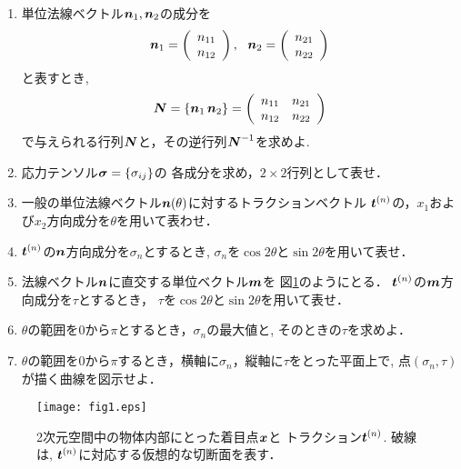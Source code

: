 \documentclass[10pt,a4j]{jarticle}
\begin{document}
\begin{enumerate}
\item
	単位法線ベクトル$\mbox{\boldmath $n$}_1, \mbox{\boldmath $n$}_2$の成分を
	\[
	\fat{n}_1=
	\left(
		\begin{array}{c}
			n_{11} \\
			n_{12}
		\end{array}
	\right), \ \ 
	\fat{n}_2=
	\left(
		\begin{array}{c}
			n_{21}\\
			n_{22}
		\end{array}
	\right)
	\]
	と表すとき,
	\[
		\mbox{\boldmath $N$}=\left\{ \mbox{\boldmath $n$}_1 \, \mbox{\boldmath $n$}_2 \right\} =
		\left(
		\begin{array}{cc}
			n_{11} & n_{21}  \\
			n_{12} & n_{22} 
		\end{array}
		\right)
	\]
	で与えられる行列$\mbox{\boldmath $N$}$と，その逆行列$\mbox{\boldmath $N$}^{-1}$を求めよ.
\item
	応力テンソル$\mbox{\boldmath $\sigma$}=\left\{\sigma_{ij}\right\}$の
	各成分を求め，$2\times 2$行列として表せ．
\item
	一般の単位法線ベクトル$\mbox{\boldmath $n$}(\theta)$に対するトラクションベクトル
	$\mbox{\boldmath $t$}^{(n)}$の，$x_1$および$x_2$方向成分を$\theta$を用いて表わせ．
\item
	$\mbox{\boldmath $t$}^{(n)}$の$\mbox{\boldmath $n$}$方向成分を$\sigma_n$とするとき,
	$\sigma_n$を$\cos 2\theta$と$\sin 2\theta$を用いて表せ．
\item
	法線ベクトル$\mbox{\boldmath $n$}$に直交する単位ベクトル$\mbox{\boldmath $m$}$を
	図\ref{fig:fig1}のようにとる．
	$\mbox{\boldmath $t$}^{(n)}$の$\mbox{\boldmath $m$}$方向成分を$\tau$とするとき，
	$\tau$を$\cos 2\theta$と$\sin 2\theta$を用いて表せ．
\item
	$\theta$の範囲を$0$から$\pi$とするとき，$\sigma_n$の最大値と, 
	そのときの$\tau$を求めよ．
\item
	$\theta$の範囲を$0$から$\pi$するとき，横軸に$\sigma_n$，縦軸に$\tau$をとった平面上で, 点$(\sigma_n, \tau)$が描く曲線を図示せよ．
\end{enumerate}
\begin{figure}[h]
	\begin{center}
	\texttt{[image: fig1.eps]} 
	\end{center}
	\caption{
		2次元空間中の物体内部にとった着目点$\mbox{\boldmath $x$}$と
		トラクション$\mbox{\boldmath $t$}^{(n)}$.
		破線は, $\mbox{\boldmath $t$}^{(n)}$に対応する仮想的な切断面を表す．	
	} 
	\label{fig:fig1}
\end{figure}
\end{document}

